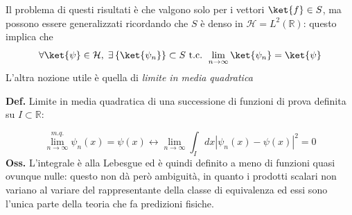 \noindent{}

Il problema di questi risultati è che valgono solo per i vettori $\ket{f}\in S$,
ma possono essere generalizzati ricordando che $ S $ è denso in
$ \mathcal{H} = L^2(\mathbb{R}) $: questo implica che
$$ \forall\ket{\psi}\in\mathcal{H},\; \exists \left\{ \ket{\psi_n} \right\}\subset S
\text{ t.c. } \lim\limits_{n\to\infty}\ket{\psi_n} = \ket{\psi} $$
\newpage
L'altra nozione utile è quella di \textit{limite in media quadratica}

\textbf{Def.} Limite in media quadratica di una successione di funzioni di prova
definita su $ I\subset\mathbb{R} $:

$$ \lim\limits_{n\to\infty}^{m.q.} \psi_n(x) = \psi(x) \leftrightarrow 
\lim\limits_{n\to\infty} \int_{I}^{}dx \left| \psi_n(x)-\psi(x)\right|^2 = 0$$
\textbf{Oss.} L'integrale è alla Lebesgue ed è quindi definito a meno di funzioni
quasi ovunque nulle: questo non dà però ambiguità, in quanto i prodotti scalari non
variano al variare del rappresentante della classe di equivalenza ed essi sono l'unica
parte della teoria che fa predizioni fisiche.

